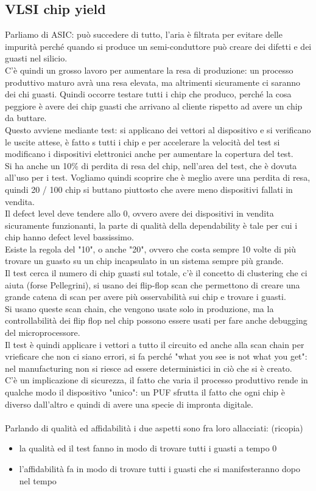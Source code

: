 \documentclass[oneside, 12pt]{extbook}
\begin{document}
\subsection{VLSI chip yield}
Parliamo di ASIC: può succedere di tutto, l'aria è filtrata per evitare delle impurità perché quando si produce un semi-conduttore può creare dei difetti e dei guasti nel silicio.\\C'è quindi un grosso lavoro per aumentare la resa di produzione: un processo produttivo maturo avrà una resa elevata, ma altrimenti sicuramente ci saranno dei chi guasti. Quindi occorre testare tutti i chip che produco, perché la cosa peggiore è avere dei chip guasti che arrivano al cliente rispetto ad avere un chip da buttare.\\Questo avviene mediante test: si applicano dei vettori al dispositivo e si verificano le uscite attese, è fatto s tutti i chip e per accelerare la velocità del test si modificano i dispositivi elettronici anche per aumentare la copertura del test.\\Si ha anche un 10\% di perdita di resa del chip, nell'area del test, che è dovuta all'uso per i test. Vogliamo quindi scoprire che è meglio avere una perdita di resa, quindi 20 / 100 chip si buttano piuttosto che avere meno dispositivi fallati in vendita.\\ Il defect level deve tendere allo 0, ovvero avere dei dispositivi in vendita sicuramente funzionanti, la parte di qualità della dependability è tale per cui i chip hanno defect level bassissimo.\\Esiste la regola del "10", o anche "20", ovvero che costa sempre 10 volte di più trovare un guasto su un chip incapsulato in un sistema sempre più grande.\\Il test cerca il numero di chip guasti sul totale, c'è il concetto di clustering che ci aiuta (forse Pellegrini), si usano dei flip-flop scan che permettono di creare una grande catena di scan per avere più osservabilità sui chip e trovare i guasti.\\Si usano queste scan chain, che vengono usate solo in produzione, ma la controllabilità dei flip flop nel chip possono essere usati per fare anche debugging del microprocessore.\\Il test è quindi applicare i vettori a tutto il circuito ed anche alla scan chain per vrieficare che non ci siano errori, si fa perché "what you see is not what you get": nel manufacturing non si riesce ad essere deterministici in ciò che si è creato.\\C'è un implicazione di sicurezza, il fatto che varia il processo produttivo rende in qualche modo il dispositivo "unico": un PUF sfrutta il fatto che ogni chip è diverso dall'altro e quindi di avere una specie di impronta digitale.\\\\Parlando di qualità ed affidabilità i due aspetti sono fra loro allacciati: (ricopia)
\begin{itemize}
	\item la qualità ed il test fanno in modo di trovare tutti i guasti a tempo 0
	\item l'affidabilità fa in modo di trovare tutti i guasti che si manifesteranno dopo nel tempo
\end{itemize}
\end{document}
